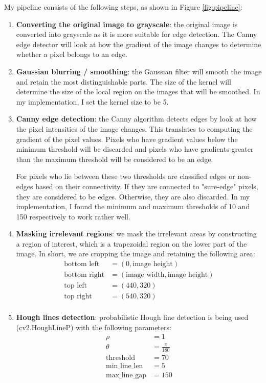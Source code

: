 \documentclass[12pt,twoside]{article}
\begin{document}
My pipeline consists of the following steps, as shown in Figure \ref{fig:pipeline}:
\begin{enumerate}
\item \textbf{Converting the original image to grayscale}: the original image is converted into grayscale as it is more suitable for edge detection. The Canny edge detector will look at how the gradient of the image changes to determine whether a pixel belongs to an edge.

\item \textbf{Gaussian blurring / smoothing}: the Gaussian filter will smooth the image and retain the most distinguishable parts. The size of the kernel will determine the size of the local region on the images that will be smoothed. In my implementation, I set the kernel size to be 5.

\item \textbf{Canny edge detection}: the Canny algorithm detects edges by look at how the pixel intensities of the image changes. This translates to computing the gradient of the pixel values. Pixels who have gradient values below the minimum threshold will be discarded and pixels who have gradients greater than the maximum threshold will be considered to be an edge. 

For pixels who lie between these two thresholds are classified edges or non-edges based on their connectivity. If they are connected to "sure-edge" pixels, they are considered to be edges. Otherwise, they are also discarded. In my implementation, I found the minimum and maximum thresholds of 10 and 150 respectively to work rather well.


\item \textbf{Masking irrelevant regions}: we mask the irrelevant areas by constructing a region of interest, which is a trapezoidal region on the lower part of the image. In short, we are cropping the image and retaining the following area:
\begin{align*}
	\text{bottom left} &= (0, \text{image height}) \\
	\text{bottom right} &= ( \text{image width},  \text{image height})\\
	\text{top left} &= (440, 320)\\
	\text{top right} &= (540, 320)\\
\end{align*}


\item \textbf{Hough lines detection}: probabilistic Hough line detection is being used (cv2.HoughLineP) with the following parameters:
\begin{align*}
	\rho &= 1\\
	\theta &= \frac{\pi}{180}\\
	\text{threshold} &= 70\\
	\text{min\_line\_len} &=5\\
	\text{max\_line\_gap} & = 150
\end{align*}


\end{enumerate}
\end{document}
